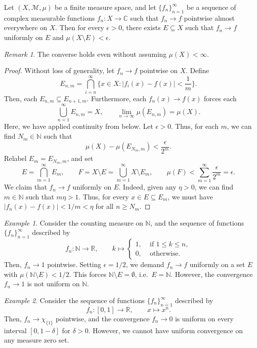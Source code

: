 \documentclass[11pt]{article}
\newcommand{\C}{\mathbb{C}}
\newcommand{\R}{\mathbb{R}}
\newcommand{\N}{\mathbb{N}}
\newcommand{\M}{\mathcal{M}}
\theoremstyle{definition}
\theoremstyle{remark}
\newtheorem*{remark}{Remark}
\newtheorem*{example}{Example}
\numberwithin{equation}{section}
\begin{document}
    \begin{theorem}[Egoroff]
        Let $(X, \M, \mu)$ be a finite measure space, and let $\{f_n\}_{n =
        1}^\infty$ be a sequence of complex measurable functions $f_n \colon X \to
        \C$ such that $f_n \to f$ pointwise almost everywhere on $X$. Then for every
        $\epsilon > 0$, there exists $E \subseteq X$ such that $f_n \to f$ uniformly
        on $E$ and $\mu(X \setminus E) < \epsilon$.

        \begin{remark}
            The converse holds even without assuming $\mu(X) < \infty$.
        \end{remark}
    \end{theorem}
    \begin{proof}
        Without loss of generality, let $f_n \to f$ pointwise on $X$. Define \[
            E_{n, m} = \bigcap_{i = n}^\infty \{x \in X : |f_i(x) - f(x)| <
            \frac{1}{m}\}.
        \] Then, each $E_{n, m} \subseteq E_{n + 1, m}$. Furthermore, each $f_n(x)
        \to f(x)$ forces each \[
            \bigcup_{n = 1}^\infty E_{n, m} = X, \qquad
            \lim_{n \to \infty} \mu(E_{n, m}) = \mu(X).
        \] Here, we have applied continuity from below. Let $\epsilon > 0$. Thus, for
        each $m$, we can find $N_m \in \N$ such that \[
            \mu(X) - \mu(E_{N_m, m}) < \frac{\epsilon}{2^m}.
        \] Relabel $E_m = E_{N_m, m}$, and set \[
            E = \bigcap_{m = 1}^\infty E_m, \qquad
            F = X\setminus E = \bigcup_{m = 1}^\infty X\setminus E_m, \qquad
            \mu(F) < \sum_{m = 1}^\infty \frac{\epsilon}{2^m} = \epsilon.
        \] We claim that $f_n \to f$ uniformly on $E$. Indeed, given any $\eta > 0$,
        we can find $m \in \N$ such that $m\eta > 1$. Thus, for every $x \in
        E\subseteq E_m$, we must have $|f_{n}(x) - f(x)| < 1 / m < \eta$ for all $n
        \geq N_m$.
    \end{proof}

    \begin{example}
        Consider the counting measure on $\N$, and the sequence of functions
        $\{f_n\}_{n = 1}^\infty$ described by \[
            f_n\colon \N \to \R, \qquad k \mapsto \begin{cases}
                1, &\text{ if } 1 \leq k \leq n, \\
                0, &\text{ otherwise}.
            \end{cases}
        \] Then, $f_n \to 1$ pointwise. Setting $\epsilon = 1 / 2$, we demand $f_n
        \to f$ uniformly on a set $E$ with $\mu(\N\setminus E) < 1 / 2$. This forces
        $\N\setminus E = \emptyset$, i.e.\ $E = \N$. However, the convergence $f_n
        \to 1$ is not uniform on $\N$.
    \end{example}
    \begin{example}
        Consider the sequence of functions $\{f_n\}_{n = 1}^\infty$ described by \[
            f_n\colon [0, 1] \to \R, \qquad x \mapsto x^n.
        \] Then, $f_n \to \chi_{\{1\}}$ pointwise, and the convergence $f_n \to 0$ is
        uniform on every interval $[0, 1 - \delta]$ for $\delta > 0$. However, we
        cannot have uniform convergence on any measure zero set.
    \end{example}
\end{document}
